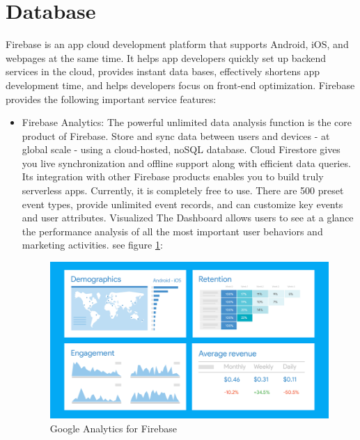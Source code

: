 \section{Database}
Firebase is an app cloud development platform that supports Android, iOS, and webpages at the same time. It helps app developers quickly set up backend services in the cloud, provides instant data bases, effectively shortens app development time, and helps developers focus on front-end optimization. Firebase provides the following important service features: \\
\begin{itemize}
\item Firebase Analytics: The powerful unlimited data analysis function is the core product of Firebase. Store and sync data between users and devices - at global scale - using a cloud-hosted, noSQL database. Cloud Firestore gives you live synchronization and offline support along with efficient data queries. Its integration with other Firebase products enables you to build truly serverless apps.\cite{1} Currently, it is completely free to use. There are 500 preset event types, provide unlimited event records, and can customize key events and user attributes. Visualized The Dashboard allows users to see at a glance the performance analysis of all the most important user behaviors and marketing activities. see figure \ref{fig:5.3 cubed graph}:
\begin{figure}[h]
	\centering
	\includegraphics[scale=0.3]{img/firebaseanalysis.png}
	\caption{Google Analytics for Firebase}
	\label{fig:5.3 cubed graph}
\end{figure}



\end{itemize}
